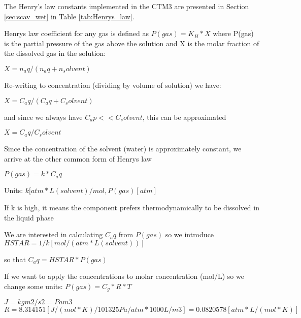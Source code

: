 The Henry's law constants implemented in the CTM3 are presented in Section \ref{sec:scav_wet} in Table \ref{tab:Henrys_law}. 

Henrys law coefficient for any gas is defined as 
$P(gas) = K_H*X$ 
where P(gas) is the partial pressure of the gas above the solution and X is the molar fraction of the dissolved gas in the solution: 

$X = n_aq /( n_aq + n_solvent)$

Re-writing to concentration (dividing by volume of solution) we have: 

$X = C_aq /( C_aq + C_solvent)$

and since we always have $C_ap << C_solvent$, this can be approximated

$X = C_aq/C_solvent$

Since the concentration of the solvent (water) is approximately constant, we arrive at the other common form of Henrys law

$P(gas) = k*C_aq$

Units: $k [atm*L(solvent)/mol, P(gas) [atm]$

If k is high, it means the component prefers thermodynamically to be dissolved in the liquid phase

We are interested in calculating $C_aq$ from $P(gas)$ so we introduce
$HSTAR = 1/k [mol/(atm*L(solvent))]$

so that $C_aq = HSTAR *P(gas)$


If we want to apply the concentrations to molar concentration (mol/L) so we change some units: 
$P(gas) = C_g *R*T$

$J = kg m2/s2 = Pa m3$
$R = 8.314151 [J/(mol*K)/101325 Pa/atm*1000 L/m3] = 0.0820578 [atm*L/(mol*K)]$

